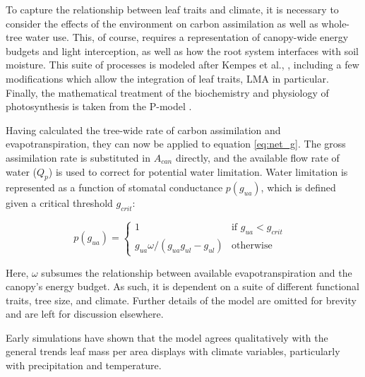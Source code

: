 To capture the relationship between leaf traits and climate, it is necessary to consider the effects of the environment on carbon assimilation as well as whole-tree water use. This, of course, requires a representation of canopy-wide energy budgets and light interception, as well as how the root system interfaces with soil moisture. This suite of processes is modeled after Kempes et al., \cite{kempes2011a}, including a few modifications which allow the integration of leaf traits, LMA in particular. Finally, the mathematical treatment of the biochemistry and physiology of photosynthesis is taken from the P-model \cite{stocker_p-model_2020}.

Having calculated the tree-wide rate of carbon assimilation and evapotranspiration, they can now be applied to equation \ref{eq:net_g}. The gross assimilation rate is substituted in $A_{can}$ directly, and the available flow rate of water ($Q_p$) is used to correct for potential water limitation. Water limitation is represented as a function of stomatal conductance $p(g_{ua})$, which is defined given a critical threshold $g_{crit}$:

\begin{equation}
    p(g_{ua}) = 
    \begin{cases}
         1 & \text{if $g_{ua} < g_{crit}$ }\\
         g_{ua}\omega/(g_{ua}g_{ul} - g_{ul}) & \text{otherwise}
    \end{cases}
\end{equation}

Here, $\omega$ subsumes the relationship between available evapotranspiration and the canopy's energy budget. As such, it is dependent on a suite of different functional traits, tree size, and climate. Further details of the model are omitted for brevity and are left for discussion elsewhere.




Early simulations have shown that the model agrees qualitatively with the general trends leaf mass per area displays with climate variables, particularly with precipitation and temperature.

